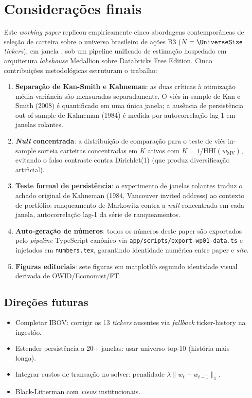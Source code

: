 \documentclass[12pt,a4paper,oneside]{article}
\begin{document}
\section{Considerações finais}\label{sec:conclusao}

Este \textit{working paper} replicou empiricamente cinco abordagens
contemporâneas de seleção de carteira sobre o universo brasileiro de
ações B3 ($N = \UniverseSize$ \textit{tickers}), em janela
\UniverseDates, sob um pipeline unificado de estimação hospedado em
arquitetura \textit{lakehouse} Medallion sobre Databricks Free
Edition. Cinco contribuições metodológicas estruturam o trabalho:

\begin{enumerate}
\item \textbf{Separação de Kan-Smith e Kahneman}: as duas críticas à
otimização média-variância são mensuradas separadamente. O viés
in-sample de Kan e Smith (2008) é quantificado em uma única janela; a
ausência de persistência out-of-sample de Kahneman (1984) é medida
por autocorrelação lag-1 em janelas rolantes.
\item \textbf{\textit{Null} concentrada}: a distribuição de comparação
para o teste de viés in-sample sorteia carteiras concentradas em $K$
ativos com $K = 1 / \mathrm{HHI}(w_{\mathrm{MV}})$, evitando o falso
contraste contra Dirichlet(1) (que produz diversificação artificial).
\item \textbf{Teste formal de persistência}: o experimento de
janelas rolantes traduz o achado original de Kahneman (1984, Vancouver
invited address) ao contexto de portfólio: ranqueamento de Markowitz
contra a \textit{null} concentrada em cada janela, autocorrelação
lag-1 da série de ranqueamentos.
\item \textbf{Auto-geração de números}: todos os números deste paper
são exportados pelo \textit{pipeline} TypeScript canônico via
\texttt{app/scripts/export-wp01-data.ts} e injetados em
\texttt{numbers.tex}, garantindo identidade numérica entre paper e
\textit{site}.
\item \textbf{Figuras editoriais}: sete figuras em matplotlib seguindo
identidade visual derivada de OWID/Economist/FT.
\end{enumerate}

\subsection*{Direções futuras}

\begin{itemize}
\item Completar IBOV: corrigir os 13 \textit{tickers} ausentes via
\textit{fallback} ticker-history na ingestão.
\item Estender persistência a 20+ janelas: usar universo top-10
(história mais longa).
\item Integrar custos de transação no solver: penalidade
$\lambda \|w_t - w_{t-1}\|_1$.
\item Black-Litterman com \textit{views} institucionais.
\end{itemize}
\end{document}
